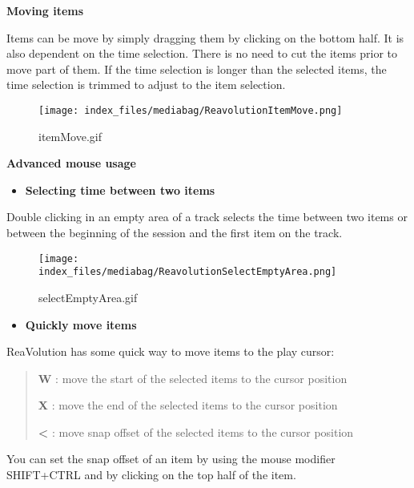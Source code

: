 \documentclass[
  letterpaper,
  DIV=11,
  numbers=noendperiod]{scrreport}
\providecommand{\tightlist}{%
  \setlength{\itemsep}{0pt}\setlength{\parskip}{0pt}}\usepackage{longtable,booktabs,array}
\begin{document}
\textbf{Moving items}

Items can be move by simply dragging them by clicking on the bottom
half. It is also dependent on the time selection. There is no need to
cut the items prior to move part of them. If the time selection is
longer than the selected items, the time selection is trimmed to adjust
to the item selection.

\begin{figure}

{\centering \texttt{[image: index\_files/mediabag/ReavolutionItemMove.png]}

}

\caption{itemMove.gif}

\end{figure}

\textbf{Advanced mouse usage}

\begin{itemize}
\tightlist
\item
  \textbf{Selecting time between two items}
\end{itemize}

Double clicking in an empty area of a track selects the time between two
items or between the beginning of the session and the first item on the
track.

\begin{figure}

{\centering \texttt{[image: index\_files/mediabag/ReavolutionSelectEmptyArea.png]}

}

\caption{selectEmptyArea.gif}

\end{figure}

\begin{itemize}
\tightlist
\item
  \textbf{Quickly move items}
\end{itemize}

ReaVolution has some quick way to move items to the play cursor:

\begin{quote}
\textbf{W} : move the start of the selected items to the cursor position

\textbf{X} : move the end of the selected items to the cursor position

\textbf{\textless{}} : move snap offset of the selected items to the
cursor position
\end{quote}

You can set the snap offset of an item by using the mouse modifier
SHIFT+CTRL and by clicking on the top half of the item.
\end{document}
